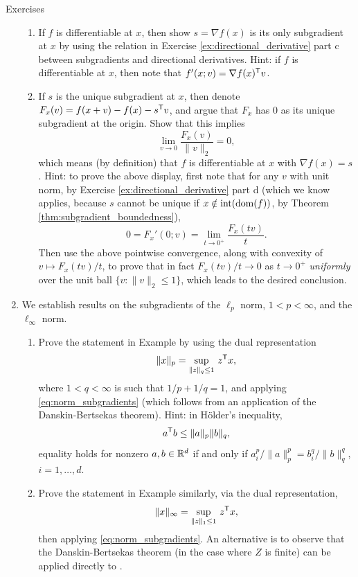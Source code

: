 \begin{xcb}{Exercises}
\begin{enumerate}[label=\thechapter.\arabic*]
\begin{enumerate}[label=\alph*.]
\item If $f$ is differentiable at $x$, then show $s = \nabla f(x)$ is its
  only subgradient at $x$ by using the relation in Exercise
  \ref{ex:directional_derivative} part c between subgradients and directional 
  derivatives. Hint: if $f$ is differentiable at $x$, then note that $f'(x; v) =
  \nabla f(x)^{\mathsf{T}} v$.  

\item If $s$ is the unique subgradient at $x$, then denote $F_x(v) = f(x + v) -
  f(x) - s^{\mathsf{T}} v$, and argue that $F_x$ has 0 as its unique subgradient at the 
  origin. Show that this implies    
  \[
  \lim_{v \to 0} \frac{F_x(v)}{\|v\|_2} = 0,
  \]
  which means (by definition) that $f$ is differentiable at $x$ with $\nabla
  f(x) = s$. Hint: to prove the above display, first note that for any $v$ with
  unit norm, by Exercise \ref{ex:directional_derivative} part d (which we know
  applies, because $s$ cannot be unique if $x \notin \operatorname{int}(\operatorname{dom}(f))$, by
  Theorem \ref{thm:subgradient_boundedness}), 
  \[
  0 = F_x'(0; v) = \lim_{t \to 0^+} \frac{F_x(tv)}{t}.
  \]
  Then use the above pointwise convergence, along with convexity of $v \mapsto
  F_x(tv)/t$, to prove that in fact $F_x(tv)/t \to 0$ as $t \to 0^+$
  \emph{uniformly} over the unit ball $\{ v : \|v\|_2 \leq 1\}$, which leads to 
  the desired conclusion.    
\end{enumerate}
 
\item \label{ex:lp_norm_subgradients}
  We establish results on the subgradients of the $\ell_p$ norm, $1 < p <
  \infty$, and the $\ell_\infty$ norm. 

\begin{enumerate}[label=\alph*.]
\item Prove the statement in Example  by using 
  the dual representation    
  \[
  \|x\|_p = \sup_{\|z\|_q \leq 1} \, z^{\mathsf{T}} x,
  \]
  where $1 < q < \infty$ is such that $1/p + 1/q = 1$, and applying
  \eqref{eq:norm_subgradients} (which follows from an application of the   
  Danskin-Bertsekas theorem). Hint: in H{\"o}lder's inequality,
  \[
  a^{\mathsf{T}} b \leq \|a\|_p \|b\|_q,
  \] 
  equality holds for nonzero $a,b \in \mathbb{R}^d$ if and only if $a_i^p/\|a\|_p^p =
  b_i^q/\|b\|_q^q$, $i=1,\ldots,d$.  
  
\item Prove the statement in Example 
  similarly, via the dual representation,   
  \[
  \|x\|_\infty = \sup_{\|z\|_1 \leq 1} \, z^{\mathsf{T}} x,
  \]
  then applying \eqref{eq:norm_subgradients}. An alternative is to observe that
  the Danskin-Bertsekas theorem (in the case where $Z$ is finite) can be applied
  directly to .     
\end{enumerate}


\end{enumerate}
\end{xcb}
